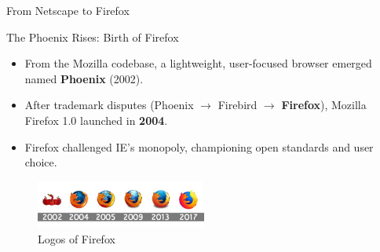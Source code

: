 \documentclass{beamer}
\begin{document}
\begin{frame}[t]{From Netscape to Firefox}
\begin{block}{The Phoenix Rises: Birth of Firefox}
\begin{itemize}
    \item From the Mozilla codebase, a lightweight, user-focused browser emerged named \textbf{Phoenix} (2002).
    \item After trademark disputes (Phoenix $\rightarrow$ Firebird $\rightarrow$ \textbf{Firefox}), Mozilla Firefox 1.0 launched in \textbf{2004}.
    \item Firefox challenged IE's monopoly, championing open standards and user choice.
\end{itemize}
\end{block}

    \begin{figure}
        \includegraphics[width=0.5\textwidth]{images/firefox-logo.jpg}
        \caption{Logos of Firefox}
    \end{figure}

\end{frame}
\end{document}
